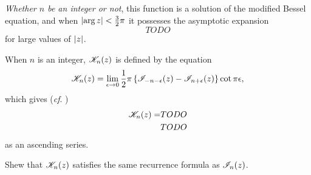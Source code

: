 \documentclass{book}
\begin{document}
    \emph{Whether $n$ be an integer or not}, this function is a
    solution of the modified Bessel equation, and when
    $\left| \arg z \right| < \frac{3}{2} \pi$ it possesses the asymptotic
    expansion
    $$
    TODO
    $$
    for large values of $\left| z \right|$.

    When $n$ is an integer, $\mathscr{K}_n(z)$ is defined by the equation
    $$
    \mathscr{K}_n(z)
    =
    \lim_{\epsilon\rightarrow 0}
    \frac{1}{2} \pi
    \left\{  \mathscr{I}_{-n-\epsilon}(z) - \mathscr{I}_{n+\epsilon}(z) \right\} \cot \pi\epsilon,
    $$
    which gives (\emph{cf}. )
    \begin{align*}
      \mathscr{K}_n(z)
      =&
      TODO
      \\
      &
      TODO
    \end{align*}
    as an ascending series.
    \begin{wandwexample}
      Shew that $\mathscr{K}_n(z)$ satisfies the same recurrence formula as
      $\mathscr{I}_n(z)$. 
    \end{wandwexample}
  
\end{document}
